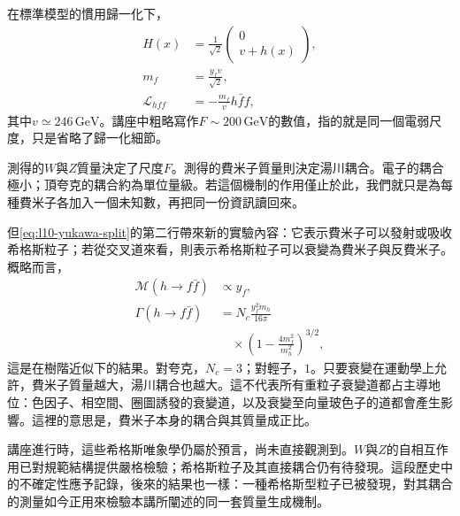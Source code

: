 在標準模型的慣用歸一化下，
\begin{equation}
\begin{aligned}
  H(x)&=\frac{1}{\sqrt2}
  \begin{pmatrix}
    0\\ v+h(x)
  \end{pmatrix},
  \\
  m_f&=\frac{y_fv}{\sqrt2},
  \\
  \mathcal L_{hff}&=-\frac{m_f}{v}h\bar f f,
\end{aligned}
  \label{eq:l10-standard-higgs-normalization}
\end{equation}
其中\(v\simeq246\,\mathrm{GeV}\)。講座中粗略寫作\(F\sim200\,\mathrm{GeV}\)的數值，指的就是同一個電弱尺度，只是省略了歸一化細節。

測得的\(W\)與\(Z\)質量決定了尺度\(F\)。測得的費米子質量則決定湯川耦合。電子的耦合極小；頂夸克的耦合約為單位量級。若這個機制的作用僅止於此，我們就只是為每種費米子各加入一個未知數，再把同一份資訊讀回來。

但\eqref{eq:l10-yukawa-split}的第二行帶來新的實驗內容：它表示費米子可以發射或吸收希格斯粒子；若從交叉道來看，則表示希格斯粒子可以衰變為費米子與反費米子。概略而言，
\begin{equation}
\begin{aligned}
  \mathcal M(h\to f\bar f)&\propto y_f,
  \\
  \Gamma(h\to f\bar f)
  &=
  N_c\frac{y_f^2m_h}{16\pi}
  \\
  &\quad\times
  \left(1-\frac{4m_f^2}{m_h^2}\right)^{3/2},
\end{aligned}
  \label{eq:l10-higgs-fermion-width}
\end{equation}
這是在樹階近似下的結果。對夸克，\(N_c=3\)；對輕子，\(1\)。只要衰變在運動學上允許，費米子質量越大，湯川耦合也越大。這不代表所有重粒子衰變道都占主導地位：色因子、相空間、圈圖誘發的衰變道，以及衰變至向量玻色子的道都會產生影響。這裡的意思是，費米子本身的耦合與其質量成正比。

\begin{classroomqa}
\end{classroomqa}

講座進行時，這些希格斯唯象學仍屬於預言，尚未直接觀測到。\(W\)與\(Z\)的自相互作用已對規範結構提供嚴格檢驗；希格斯粒子及其直接耦合仍有待發現。這段歷史中的不確定性應予記錄，後來的結果也一樣：一種希格斯型粒子已被發現，對其耦合的測量如今正用來檢驗本講所闡述的同一套質量生成機制。

